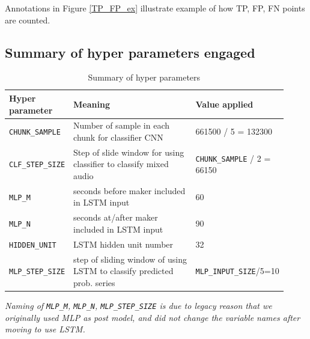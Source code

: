 \documentclass{article}
\begin{document}
    Annotations in Figure \ref{TP_FP_ex} illustrate example of how TP, FP, FN points are counted.

    \subsection{Summary of hyper parameters engaged}
    \begin{table}[H]
        \centering
        \begin{tabular}{|p{0.16\linewidth}|p{0.5\linewidth}|p{0.26\linewidth}|}
            \hline
            Hyper parameter & Meaning & Value applied \\ \hline
            \lstinline|CHUNK_SAMPLE| & Number of sample in each chunk for classifier CNN & 661500 / 5 = 132300 \\ \hline 
            \lstinline|CLF_STEP_SIZE| & Step of slide window for using classifier to classify mixed audio & \lstinline|CHUNK_SAMPLE| / 2 = 66150 \\ \hline
            \lstinline|MLP_M| & seconds before maker included in LSTM input & 60 \\ \hline 
            \lstinline|MLP_N| & seconds at/after maker included in LSTM input & 90 \\ \hline
            \lstinline|HIDDEN_UNIT| & LSTM hidden unit number &  32 \\ \hline
            \lstinline|MLP_STEP_SIZE| & step of sliding window of using LSTM to classify predicted prob. series & \lstinline|MLP_INPUT_SIZE|/5=10 \\ \hline
        \end{tabular}
        \caption{Summary of hyper parameters}
    \end{table}
    \textit{Naming of \lstinline|MLP_M|, \lstinline|MLP_N|, \lstinline|MLP_STEP_SIZE| is due to legacy reason that we originally used MLP as post model, and did not change the variable names after moving to use LSTM. }

\end{document}
